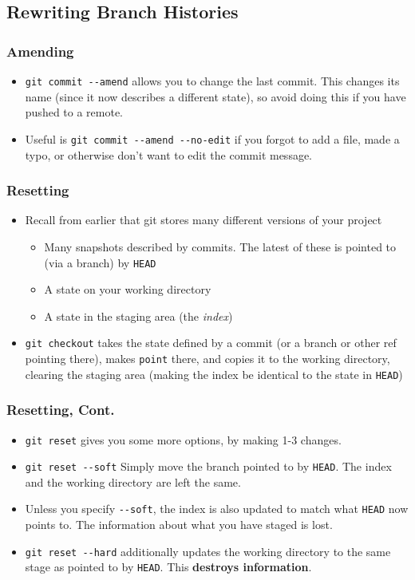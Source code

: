 \documentclass{beamer}
\begin{document}
\subsection{Rewriting Branch Histories}

\begin{frame}[fragile]
\frametitle{Amending}
\begin{itemize}
\item \lstinline{git commit --amend} allows you to change the last commit. This changes its name (since it now describes a different state), so avoid doing this if you have pushed to a remote.
\item Useful is \lstinline{git commit --amend --no-edit} if you forgot to add a file, made a typo, or otherwise don't want to edit the commit message.
\end{itemize}
\end{frame}

\begin{frame}[fragile]
\frametitle{Resetting}
\begin{itemize}
\item Recall from earlier that git stores many different versions of your project
\begin{itemize}
\item Many snapshots described by commits. The latest of these is pointed to (via a branch) by \texttt{HEAD}
\item A state on your working directory
\item A state in the staging area (the \emph{index})
\end{itemize}
\item \lstinline{git checkout} takes the state defined by a commit (or a branch or other ref pointing there), makes \lstinline{point} there, and copies it to the working directory, clearing the staging area (making the index be identical to the state in \lstinline{HEAD})
\end{itemize}
\end{frame}

\begin{frame}[fragile]
\frametitle{Resetting, Cont.}
\begin{itemize}
\item \lstinline{git reset} gives you some more options, by making 1-3 changes.
\item \lstinline{git reset --soft} Simply move the branch pointed to by \lstinline{HEAD}. The index and the working directory are left the same.
\item Unless you specify \lstinline{--soft}, the index is also updated to match what \lstinline{HEAD} now points to. The information about what you have staged is lost.
\item \lstinline{git reset --hard} additionally updates the working directory to the same stage as pointed to by \lstinline{HEAD}. This \textbf{destroys information}.
\end{itemize}
\end{frame}
\end{document}
